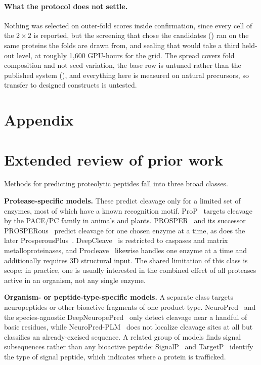 \documentclass{article}
\begin{document}
\paragraph{What the protocol does not settle.} Nothing was selected on outer-fold
scores inside confirmation, since every cell of the $2\times2$ is reported, but the screening that
chose the candidates () ran on the same proteins the folds are drawn
from, and sealing that would take a third held-out level, at roughly 1{,}600 GPU-hours for the grid. The spread covers fold composition and not seed variation,
the base row is untuned rather than the published system (), and everything
here is measured on natural precursors, so transfer to designed constructs is untested.




\newpage
\appendix
\section*{Appendix}

\section{Extended review of prior work}
\label{sec:app-related}


Methods for predicting proteolytic peptides fall into three broad classes.

\textbf{Protease-specific models.} These predict cleavage only for a limited set of enzymes, most of which have a known recognition motif. ProP~\citep{duckert2004prop} targets cleavage by the PACE/PC family in animals and plants. PROSPER~\citep{song2012prosper} and its successor PROSPERous~\citep{song2018prosperous} predict cleavage for one chosen enzyme at a time, as does the later ProsperousPlus~\citep{li2023prosperousplus}. DeepCleave~\citep{li2020deepcleave} is restricted to caspases and matrix metalloproteinases, and Procleave~\citep{li2020procleave} likewise handles one enzyme at a time and additionally requires 3D structural input. The shared limitation of this class is scope: in practice, one is usually interested in the combined effect of all proteases active in an organism, not any single enzyme.

\textbf{Organism- or peptide-type-specific models.} A separate class targets neuropeptides or other bioactive fragments of one product type. NeuroPred~\citep{southey2006neuropred} and the species-agnostic DeepNeuropePred~\citep{wang2024deepneuropepred} only detect cleavage near a handful of basic residues, while NeuroPred-PLM~\citep{wang2023neuropredplm} does not localize cleavage sites at all but classifies an already-excised sequence. A related group of models finds signal subsequences rather than any bioactive peptide: SignalP~\citep{teufel2022signalp6} and TargetP~\citep{almagro2019targetp} identify the type of signal peptide, which indicates where a protein is trafficked.
\end{document}

